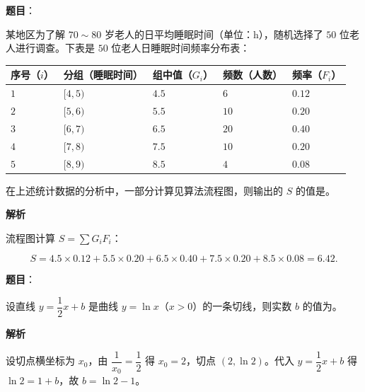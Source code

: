 \begin{answer}

\textbf{题目}：

某地区为了解 $70\sim80$ 岁老人的日平均睡眠时间（单位：h），随机选择了 $50$ 位老人进行调查。下表是 $50$ 位老人日睡眠时间频率分布表：

\begin{center}
\begin{tabular}{lllll}
\toprule
序号（$i$） & 分组（睡眠时间） & 组中值（$G_i$） & 频数（人数） & 频率（$F_i$） \\
\midrule
$1$ & $[4,5)$ & $4.5$ & $6$ & $0.12$ \\
$2$ & $[5,6)$ & $5.5$ & $10$ & $0.20$ \\
$3$ & $[6,7)$ & $6.5$ & $20$ & $0.40$ \\
$4$ & $[7,8)$ & $7.5$ & $10$ & $0.20$ \\
$5$ & $[8,9)$ & $8.5$ & $4$ & $0.08$ \\
\bottomrule
\end{tabular}
\end{center}

在上述统计数据的分析中，一部分计算见算法流程图，则输出的 $S$ 的值是\gkblank{}。
\nopagebreak[4]
\begin{center}\end{center}
\nopagebreak[4]
\textbf{解析}

流程图计算 $S=\sum G_iF_i$：

\nopagebreak[4]
\[S=4.5\times0.12+5.5\times0.20+6.5\times0.40+7.5\times0.20+8.5\times0.08=6.42.\]


\end{answer}
\begin{answer}

\textbf{题目}：

设直线 $y=\dfrac12x+b$ 是曲线 $y=\ln x$（$x>0$）的一条切线，则实数 $b$ 的值为\gkblank{}。

\textbf{解析}

设切点横坐标为 $x_0$，由 $\dfrac1{x_0}=\dfrac12$ 得 $x_0=2$，切点 $(2,\ln2)$。代入 $y=\dfrac12x+b$ 得 $\ln2=1+b$，故 $b=\ln2-1$。


\end{answer}
